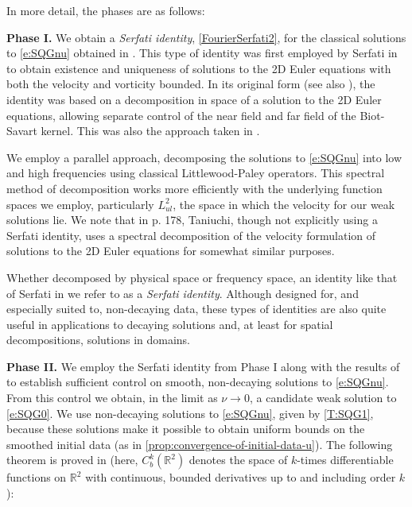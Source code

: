 \documentclass[11pt,reqno,xcolor=svgnames]{amsart}
\def\R{{\mathbb R}}
\theoremstyle{plain}
\theoremstyle{definition}
\theoremstyle{plain}
\theoremstyle{remark}
\begin{document}
In more detail, the phases are as follows:

\smallskip\noindent\textbf{Phase I.} We obtain a \textit{Serfati identity}, \cref{FourierSerfati2}, for the classical solutions to \cref{e:SQGnu} obtained in \cite{AACK25}. This type of identity was first employed by Serfati in \cite{Serfati} to obtain existence and uniqueness of solutions to the 2D Euler equations with both the velocity and vorticity bounded. In its original form (see also \cite{AKLN2015}), the identity was based on a decomposition in space of a solution to the 2D Euler equations, allowing separate control of the near field and far field of the Biot-Savart kernel. This was also the approach taken in \cite{AKLN2015,CozziKelliher2019,KBounded,Ambrose2025,Ciampa2022,CiampaCrippaSpirito2021}.

We employ a parallel approach, decomposing the solutions to \cref{e:SQGnu} into low and high frequencies using classical Littlewood-Paley operators. This spectral method of  decomposition works more efficiently with the underlying function spaces we employ, particularly $L^2_{ul}$, the space in which the velocity for our weak solutions lie. We note that in \cite{Taniuchi} p. 178, Taniuchi, though not explicitly using a Serfati identity, uses a spectral decomposition of the velocity formulation of solutions to the 2D Euler equations for somewhat similar purposes.



Whether decomposed by physical space or frequency space, an identity like that of Serfati in \cite{Serfati} we refer to as a \textit{Serfati identity}. Although designed for, and especially suited to, non-decaying data, these types of identities are also quite useful in applications to decaying solutions and, at least for spatial decompositions, solutions in domains. 


\bigskip

\smallskip\noindent\textbf{Phase II.} We employ the Serfati identity from Phase I along with the results of \cite{AACK25} to establish sufficient control on smooth, non-decaying solutions to \cref{e:SQGnu}.  From this control we obtain, in the limit as $\nu \to 0$, a candidate weak solution to \cref{e:SQG0}. We use non-decaying solutions to \cref{e:SQGnu}, given by \cref{T:SQG1}, because these solutions make it possible to obtain uniform bounds on the smoothed initial data (as in \cref{prop:convergence-of-initial-data-u}).  The following theorem is proved in \cite{AACK25} (here, $C^k_b(\R^2)$ denotes the space of $k$-times differentiable functions on $\R^2$ with continuous, bounded derivatives up to and including order $k$):
\end{document}
